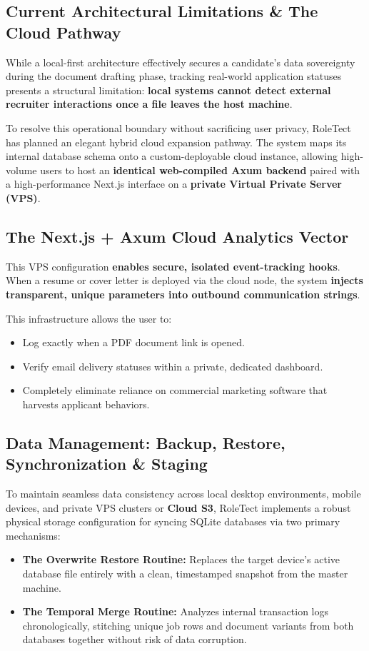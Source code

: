 \documentclass[10pt,a4paper]{article}
\begin{document}
\subsection{Current Architectural Limitations \& The Cloud Pathway}
While a local-first architecture effectively secures a candidate's data sovereignty during the document drafting phase, tracking real-world application statuses presents a structural limitation: \textbf{local systems cannot detect external recruiter interactions once a file leaves the host machine}.

To resolve this operational boundary without sacrificing user privacy, RoleTect has planned an elegant hybrid cloud expansion pathway. The system maps its internal database schema onto a custom-deployable cloud instance, allowing high-volume users to host an \textbf{identical web-compiled Axum backend} paired with a high-performance Next.js interface on a \textbf{private Virtual Private Server (VPS)}.

\subsection{The Next.js + Axum Cloud Analytics Vector}
This VPS configuration \textbf{enables secure, isolated event-tracking hooks}. When a resume or cover letter is deployed via the cloud node, the system \textbf{injects transparent, unique parameters into outbound communication strings}.

This infrastructure allows the user to:
\begin{itemize}
    \item Log exactly when a PDF document link is opened.
    \item Verify email delivery statuses within a private, dedicated dashboard.
    \item Completely eliminate reliance on commercial marketing software that harvests applicant behaviors.
\end{itemize}

\subsection{Data Management: Backup, Restore, Synchronization \& Staging}
To maintain seamless data consistency across local desktop environments, mobile devices, and private VPS clusters or \textbf{Cloud S3}, RoleTect implements a robust physical storage configuration for syncing SQLite databases via two primary mechanisms:
\begin{itemize}
    \item \textbf{The Overwrite Restore Routine:} Replaces the target device's active database file entirely with a clean, timestamped snapshot from the master machine.
    \item \textbf{The Temporal Merge Routine:} Analyzes internal transaction logs chronologically, stitching unique job rows and document variants from both databases together without risk of data corruption.
\end{itemize}
\end{document}
